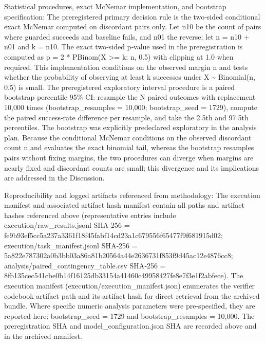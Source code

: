 \documentclass[conference]{IEEEtran}
\begin{document}
Statistical procedures, exact McNemar implementation, and bootstrap specification: The preregistered primary decision rule is the two‑sided conditional exact McNemar computed on discordant pairs only. Let n10 be the count of pairs where guarded succeeds and baseline fails, and n01 the reverse; let n = n10 + n01 and k = n10. The exact two‑sided p‑value used in the preregistration is computed as p = 2 * PBinom(X >= k; n, 0.5) with clipping at 1.0 when required. This implementation conditions on the observed margin n and tests whether the probability of observing at least k successes under X \textasciitilde{} Binomial(n, 0.5) is small. The preregistered exploratory interval procedure is a paired bootstrap percentile 95\% CI: resample the N paired outcomes with replacement 10,000 times (bootstrap\_resamples = 10,000; bootstrap\_seed = 1729), compute the paired success‑rate difference per resample, and take the 2.5th and 97.5th percentiles. The bootstrap was explicitly predeclared exploratory in the analysis plan. Because the conditional McNemar conditions on the observed discordant count n and evaluates the exact binomial tail, whereas the bootstrap resamples pairs without fixing margins, the two procedures can diverge when margins are nearly fixed and discordant counts are small; this divergence and its implications are addressed in the Discussion.

Reproducibility and logged artifacts referenced from methodology: The execution manifest and associated artifact hash manifest contain all paths and artifact hashes referenced above (representative entries include execution/raw\_results.jsonl SHA‑256 = fe9b93ef\allowbreak{}5cc5a237\allowbreak{}a3361f18\allowbreak{}f45fabf1\allowbreak{}4cd23a1c\allowbreak{}679556f6\allowbreak{}5477f9f6\allowbreak{}81915d02; execution/task\_manifest.jsonl SHA‑256 = 5a822e78\allowbreak{}7302a0b3\allowbreak{}bb03a86a\allowbreak{}81b20564\allowbreak{}a44e2636\allowbreak{}731f853f\allowbreak{}9d45ac12\allowbreak{}e4876cc8; analysis/paired\_contingency\_table.csv SHA‑256 = 8fb135ce\allowbreak{}c541cbe0\allowbreak{}b14f1612\allowbreak{}5db33154\allowbreak{}a41460c4\allowbreak{}9958427f\allowbreak{}e8e7f3e1\allowbreak{}f2abfece). The execution manifest (execution/execution\_manifest.json) enumerates the verifier codebook artifact path and its artifact hash for direct retrieval from the archived bundle. Where specific numeric analysis parameters were pre‑specified, they are reported here: bootstrap\_seed = 1729 and bootstrap\_resamples = 10,000. The preregistration SHA and model\_configuration.json SHA are recorded above and in the archived manifest.
\end{document}
